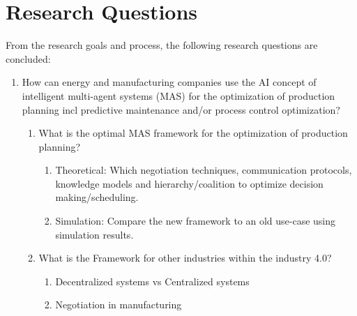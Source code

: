 \section{Research Questions}
From the research goals and process, the following research questions are concluded:
\begin{enumerate}
	\item
	How can energy and manufacturing companies use the AI concept of intelligent multi-agent systems (MAS) for the optimization of production planning incl predictive maintenance and/or process control optimization?
	\begin{enumerate}
		\item
		What is the optimal MAS framework for the optimization of production planning?
		\begin{enumerate}
			\item 
			Theoretical: Which negotiation techniques, communication protocols, knowledge models and hierarchy/coalition to optimize decision making/scheduling.
			\item
			Simulation: Compare the new framework to an old use-case using simulation results.
		\end{enumerate}
		\item
		What is the Framework for other industries within the industry 4.0?
		\begin{enumerate}
			\item 
			Decentralized systems vs Centralized systems
			\item
			Negotiation in manufacturing
		\end{enumerate}
	\end{enumerate}
\end{enumerate}

